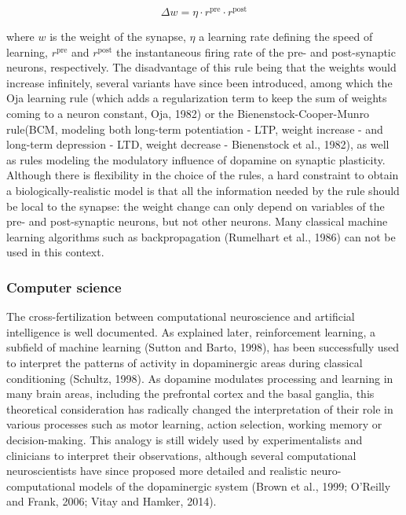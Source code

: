 \documentclass[
  11pt,
  a4paper,
]{scrbook}
\begin{document}
\[
    \Delta w = \eta \cdot r^\text{pre} \cdot r^\text{post} 
\]

where \(w\) is the weight of the synapse, \(\eta\) a learning rate
defining the speed of learning, \(r^\text{pre}\) and \(r^\text{post}\)
the instantaneous firing rate of the pre- and post-synaptic neurons,
respectively. The disadvantage of this rule being that the weights would
increase infinitely, several variants have since been introduced, among
which the Oja learning rule (which adds a regularization term to keep
the sum of weights coming to a neuron constant, Oja, 1982) or the
Bienenstock-Cooper-Munro rule(BCM, modeling both long-term potentiation
- LTP, weight increase - and long-term depression - LTD, weight decrease
- Bienenstock et al., 1982), as well as rules modeling the modulatory
influence of dopamine on synaptic plasticity. Although there is
flexibility in the choice of the rules, a hard constraint to obtain a
biologically-realistic model is that all the information needed by the
rule should be local to the synapse: the weight change can only depend
on variables of the pre- and post-synaptic neurons, but not other
neurons. Many classical machine learning algorithms such as
backpropagation (Rumelhart et al., 1986) can not be used in this
context.

\subsubsection*{Computer science}\label{computer-science}

The cross-fertilization between computational neuroscience and
artificial intelligence is well documented. As explained later,
reinforcement learning, a subfield of machine learning (Sutton and
Barto, 1998), has been successfully used to interpret the patterns of
activity in dopaminergic areas during classical conditioning (Schultz,
1998). As dopamine modulates processing and learning in many brain
areas, including the prefrontal cortex and the basal ganglia, this
theoretical consideration has radically changed the interpretation of
their role in various processes such as motor learning, action
selection, working memory or decision-making. This analogy is still
widely used by experimentalists and clinicians to interpret their
observations, although several computational neuroscientists have since
proposed more detailed and realistic neuro-computational models of the
dopaminergic system (Brown et al., 1999; O'Reilly and Frank, 2006; Vitay
and Hamker, 2014).
\end{document}
